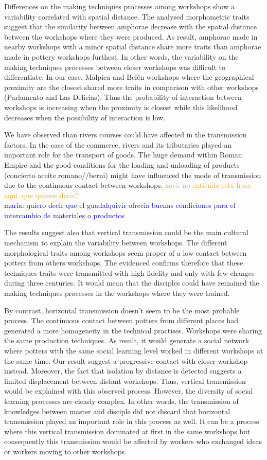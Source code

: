 \documentclass[review]{elsarticle}
\newcommand{\memo}[2]{\textcolor{#1}{#2}}
\newcommand{\xavi}[1]{\memo{orange}{xavi: #1\\}}
\newcommand{\maria}[1]{\memo{blue}{maria: #1\\}}
\begin{document}
Differences on the making techniques processes among workshops show a variability correlated with spatial distance. The analysed morphometric traits suggest that the similarity between amphorae decrease with the spatial distance between the workshops where they were produced. As result, amphorae made in nearby workshops with a minor spatial distance share more traits than amphorae made in pottery workshops furthest. In other words, the variability on the making techniques processes between closer workshops was difficult to differentiate. In our case, Malpica and Bel\'en workshops where the geographical proximity are the closest shared more traits in comparison with other workshops (Parlamento and Las Delicias). Thus the probability of interaction between workshops is increasing when the proximity is closest while this likelihood decreases when the possibility of interaction is low. 

We have observed than rivers courses could have affected in the transmission factors. In the case of the commerce, rivers and its tributaries played an important role for the transport of goods. The huge demand within Roman Empire and the good conditions for the loading and unloading of products (concierto aceite romano//berni) might have influenced the mode of transmission due to the continuous contact between workshops. \xavi{no entiendo esta frase aqui. que quieres decir?} 
\maria{quiero decir que el guadalquivir ofrecia buenas condiciones para el intercambio de materiales o productos}

The results suggest also that vertical transmission could be the main cultural mechanism to explain the variability between workshops. The different morphological traits among workshops seem proper of a low contact between potters from others workshops. The evidenced confirms therefore that these techniques traits were transmitted with high fidelity and only with few changes during three centuries. It would mean that the disciples could have remained the making techniques processes in the workshops where they were trained.  

By contrast, horizontal transmission doesn't seem to be the most probable process. The continuous contact between potters from different places had generated a more homogeneity in the technical practises. Workshops were sharing the same production techniques. As result, it would generate a social network where potters with the same social learning level worked in different workshops at the same time. Our result suggest a progressive contact with closer workshop instead. Moreover, the fact that isolation by distance is detected suggests a limited displacement between distant workshops. Thus, vertical transmission would be explained with this observed process. However, the diversity of social learning processes are clearly complex. In other words, the transmission of knowledges between master and disciple did not discard that horizontal transmission played an important role in this process as well. It can be a process where this vertical transmission dominated at first in the same workshops but consequently this transmission would be affected by workers who exchanged ideas or workers moving to other workshops.  
\end{document}
